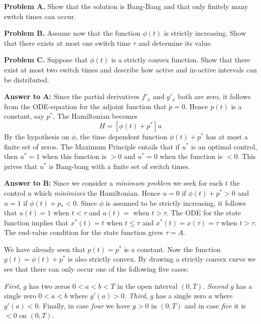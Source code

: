 \documentclass{amsart}
\begin{document}
\noindent 
{\bf Problem A.} 
Show that the solution is Bang-Bang and that only finitely many switch times can occur.
\medskip

\noindent 
{\bf Problem B.} Assume now that the function $\phi(t)$ is strictly increasing.
Show that there exists at most one switch time $\tau$ and determine its value.

\medskip


\noindent
{\bf Problem C.} Suppose that $\phi(t)$ is a strictly convex function.
Show that there exist at most two switch times
and describe how active and in-active intervals can be distributed.



\bigskip



\medskip 

\noindent
{\bf Answer to A:} Since the partial derivatives $f'_x$ and $g'_x$ both are zero, it follows from the ODE-equation for the adjoint function that $\dot p=0$. Hence $p(t)$ is a constant, say $p^*$. The Hamiltonian becomes
\begin{equation}
H=[\phi(t)+p^*]u
\end{equation} 
\medskip
\noindent
By the hypothesis on $\phi$, the time dependent function
$\phi(t)+p^*$ has at most a finite set of zeros. The Maximum Principle
entails that if $u^*$ is an optimal control, then $u^*=1$
when this function is  $>0$ and $u^*=0$ when the
function is $<0$. This prives that $u^*$ is Bang-bang with  a finite
set of switch times.
\medskip

\noindent
{\bf Answer to B:} Since we consider a {\it{minimum problem}} we seek for each $t$
the control $u$ 
which {\it{minimizes}} the Hamiltonian.
Hence  $u=0$ if $\phi(t)+p^*>0$ and $u=1$ if
$\phi(t)+p_*<0$. 
Since $\phi$ is assumed to be strictly increasing, it follows that
$u(t)=1$ when $t<\tau$ and $u(t)=$ when $t>\tau$.  The ODE for the state function implies that
$x^*(t)=t$ when $t\leq\tau$ and $x^*(t)=x(\tau)=\tau$ when $t>\tau$.
The end-value condition for the state function gives $\tau=A$.

\bigskip  

We have already seen that $p(t)=p^*$ is a constant. Now the function
$g(t)=\phi(t)+p^*$ is also strictly convex.
By drawing a strictly convex curve we see that there can only occur one of the
following five cases: 

\medskip


\noindent
\emph{First}, $g$ has two zeros 
$0<a<b<T$ in the open interval 
$(0,T)$.  \emph{Second} $g$ has a single zero $0<a<b$ where $g'(a)>0$.
\emph{Third}, $g$ has a single zero $a$ where $g'(a)<0$. Finally, in 
case \emph{four} we have 
$g>0$ in $(0,T)$ and in case \emph{five} it is $<0$ on $(0,T)$.
\medskip
\end{document}
